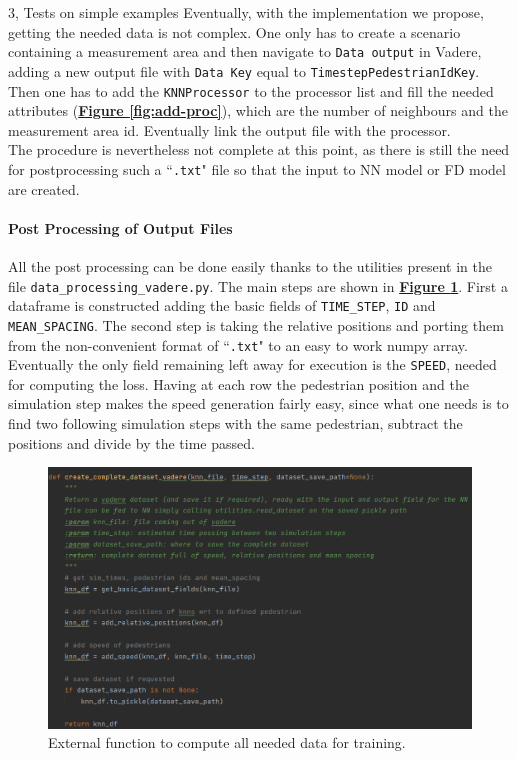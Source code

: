 \documentclass[10pt,a4paper]{article}
\begin{document}
\begin{task}{3, Tests on simple examples}
Eventually, with the implementation we propose, getting the needed data is not complex. One only has to create a scenario containing a measurement area and then navigate to \texttt{Data output} in Vadere, adding a new output file with \texttt{Data Key} equal to \texttt{TimestepPedestrianIdKey}. Then one has to add the \texttt{KNNProcessor} to the processor list and fill the needed attributes (\textbf{\hyperref[fig:add-proc]{Figure \ref{fig:add-proc}}}), which are the number of neighbours and the measurement area id. Eventually link the output file with the processor.\\
The procedure is nevertheless not complete at this point, as there is still the need for postprocessing such a ``\texttt{.txt}" file so that the input to NN model or FD model are created.

\paragraph{Post Processing of Output Files}
All the post processing can be done easily thanks to the utilities present in the file \texttt{data\_processing\_vadere.py}. The main steps are shown in \textbf{\hyperref[fig:vadere-postproc]{Figure \ref{fig:vadere-postproc}}}. First a dataframe is constructed adding the basic fields of \texttt{TIME\_STEP}, \texttt{ID} and \texttt{MEAN\_SPACING}.
The second step is taking the relative positions and porting them from the non-convenient format of ``\texttt{.txt}" to an easy to work numpy array. Eventually the only field remaining left away for execution is the \texttt{SPEED}, needed for computing the loss. Having at each row the pedestrian position and the simulation step makes the speed generation fairly easy, since what one needs is to find two following simulation steps with the same pedestrian, subtract the positions and divide by the time passed.

\begin{figure}[h]
    \centering
    \includegraphics[scale=0.65]{images/vadere-postprocess.png}
    \caption{External function to compute all needed data for training.}
    \label{fig:vadere-postproc}
\end{figure}


\end{task}
\end{document}

